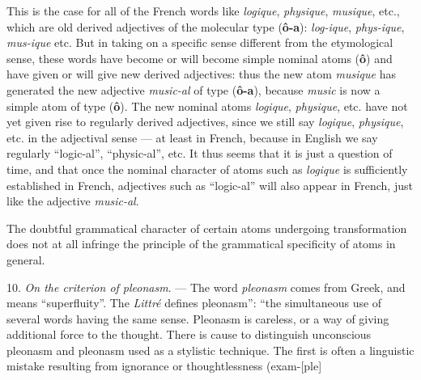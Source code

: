 \begin{sloppypar}
{{      This is the case for all of the French words like \emph{logique},
      \emph{physique}, \emph{musique}, etc., which are old derived
      adjectives of the molecular type (\textbf{ô-a}): \emph{log-ique},
      \emph{phys-ique}, \emph{mus-ique} etc. But in taking on a specific
      sense different from the etymological sense, these words have
      become or will become simple nominal atoms (\textbf{ô}) and
      have given or will give new derived adjectives: thus the new
      atom \emph{musique} has generated the new adjective \emph{music-al} of
      type (\textbf{ô-a}), because \emph{music} is now a simple atom of
      type (\textbf{ô}). The new nominal atoms \emph{logique},
      \emph{physique}, etc. have not yet given rise to regularly derived
      adjectives, since we still say \emph{logique}, \emph{physique},
      etc. in the adjectival sense --- at least in French, because in
      English we say regularly ``logic-al'', ``physic-al'', etc. It
      thus seems that it is just a question of time, and that once the
      nominal character of atoms such as \emph{logique} is sufficiently
      established in French, adjectives such as ``logic-al'' will also
      appear in French, just like the adjective \emph{music-al}.

      The doubtful grammatical character of certain atoms undergoing
      transformation does not at all infringe the principle of the
      grammatical specificity of atoms in general.

      10. \emph{On the criterion of pleonasm}. --- The word
      \emph{pleonasm} comes from Greek, and means ``superfluity''. The
      \textsl{Littré} defines pleonasm'': ``the simultaneous use of
      several words having the same sense. Pleonasm is careless, or a
      way of giving additional force to the thought. There is cause to
      distinguish unconscious pleonasm and pleonasm used as a
      stylistic technique. The first is often a linguistic mistake
      resulting from ignorance or thoughtlessness (exam-[ple]
    }

  }

\end{sloppypar}

